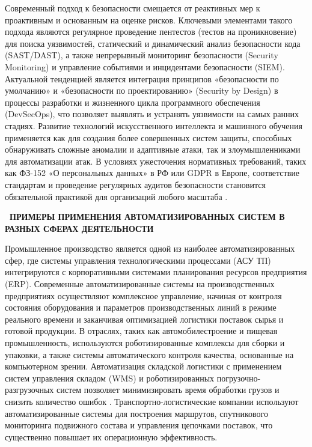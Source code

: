 \documentclass{SibFU-docs}
\begin{document}

Современный подход к безопасности смещается от реактивных мер к проактивным и основанным на оценке рисков. Ключевыми элементами такого подхода являются регулярное проведение пентестов (тестов на проникновение) для поиска уязвимостей, статический и динамический анализ безопасности кода (SAST/DAST), а также непрерывный мониторинг безопасности (Security Monitoring) и управление событиями и инцидентами безопасности (SIEM). Актуальной тенденцией является интеграция принципов «безопасности по умолчанию» и «безопасности по проектированию» (Security by Design) в процессы разработки и жизненного цикла программного обеспечения (DevSecOps), что позволяет выявлять и устранять уязвимости на самых ранних стадиях. Развитие технологий искусственного интеллекта и машинного обучения применяется как для создания более совершенных систем защиты, способных обнаруживать сложные аномалии и адаптивные атаки, так и злоумышленниками для автоматизации атак. В условиях ужесточения нормативных требований, таких как ФЗ-152 «О персональных данных» в РФ или GDPR в Европе, соответствие стандартам и проведение регулярных аудитов безопасности становится обязательной практикой для организаций любого масштаба \cite{iso27001}.

\newpage
{}
\begin{center}\textbf{\thesection\ ПРИМЕРЫ ПРИМЕНЕНИЯ АВТОМАТИЗИРОВАННЫХ СИСТЕМ В РАЗНЫХ СФЕРАХ ДЕЯТЕЛЬНОСТИ}\end{center}
\vspace*{-1.5em}

Промышленное производство является одной из наиболее автоматизированных сфер, где системы управления технологическими процессами (АСУ ТП) интегрируются с корпоративными системами планирования ресурсов предприятия (ERP). Современные автоматизированные системы на производственных предприятиях осуществляют комплексное управление, начиная от контроля состояния оборудования и параметров производственных линий в режиме реального времени и заканчивая оптимизацией логистики поставок сырья и готовой продукции. В отраслях, таких как автомобилестроение и пищевая промышленность, используются роботизированные комплексы для сборки и упаковки, а также системы автоматического контроля качества, основанные на компьютерном зрении. Автоматизация складской логистики с применением систем управления складом (WMS) и роботизированных погрузочно-разгрузочных систем позволяет минимизировать время обработки грузов и снизить количество ошибок \cite{rosstat2024}. Транспортно-логистические компании используют автоматизированные системы для построения маршрутов, спутникового мониторинга подвижного состава и управления цепочками поставок, что существенно повышает их операционную эффективность.
\end{document}
